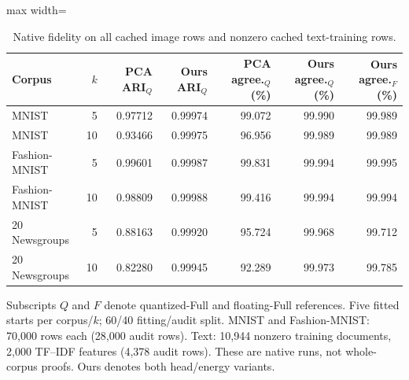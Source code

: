 \begin{table}[tp]
\caption{Native fidelity on all cached image rows and nonzero cached text-training rows.}\label{tab:full-accuracy}
\centering\small
\begin{adjustbox}{max width=\textwidth}
\begin{tabular}{@{}lrrrrrr@{}}
\toprule
Corpus & $k$ & PCA ARI$_Q$ & Ours ARI$_Q$ & PCA agree.$_Q$ (\%) & Ours agree.$_Q$ (\%) & Ours agree.$_F$ (\%) \\
\midrule
MNIST & 5 & 0.97712 & 0.99974 & 99.072 & 99.990 & 99.989 \\
MNIST & 10 & 0.93466 & 0.99975 & 96.956 & 99.989 & 99.989 \\
Fashion-MNIST & 5 & 0.99601 & 0.99987 & 99.831 & 99.994 & 99.995 \\
Fashion-MNIST & 10 & 0.98809 & 0.99988 & 99.416 & 99.994 & 99.994 \\
20 Newsgroups & 5 & 0.88163 & 0.99920 & 95.724 & 99.968 & 99.712 \\
20 Newsgroups & 10 & 0.82280 & 0.99945 & 92.289 & 99.973 & 99.785 \\
\bottomrule
\end{tabular}
\end{adjustbox}
\par\vspace{3pt}\begin{minipage}{0.98\textwidth}\footnotesize Subscripts $Q$ and $F$ denote quantized-Full and floating-Full references. Five fitted starts per corpus/$k$; 60/40 fitting/audit split. MNIST and Fashion-MNIST: 70,000 rows each (28,000 audit rows). Text: 10,944 nonzero training documents, 2,000 TF--IDF features (4,378 audit rows). These are native runs, not whole-corpus proofs. Ours denotes both head/energy variants.\end{minipage}
\end{table}
